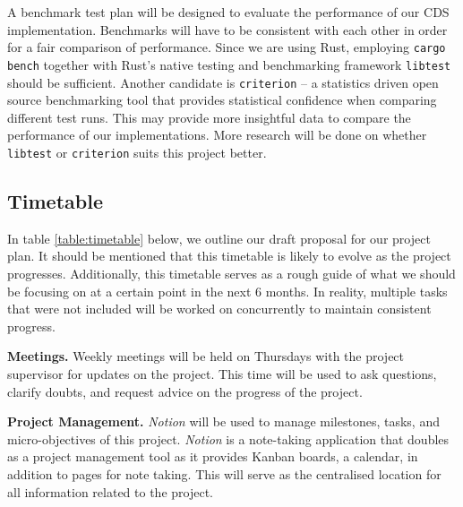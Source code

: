 A benchmark test plan will be designed to evaluate the performance of our CDS implementation. Benchmarks will have to be consistent with each other in order for a fair comparison of performance. Since we are using Rust, employing \texttt{cargo bench} together with Rust's native testing and benchmarking framework \texttt{libtest} should be sufficient. Another candidate is \texttt{criterion} -- a statistics driven open source benchmarking tool that provides statistical confidence when comparing different test runs. This may provide more insightful data to compare the performance of our implementations. More research will be done on whether \texttt{libtest} or \texttt{criterion} suits this project better.

\subsection{Timetable}
\label{sec:timetable}

In table \ref{table:timetable} below, we outline our draft proposal for our project plan. It should be mentioned that this timetable is likely to evolve as the project progresses. Additionally, this timetable serves as a rough guide of what we should be focusing on at a certain point in the next 6 months. In reality, multiple tasks that were not included will be worked on concurrently to maintain consistent progress. 

\textbf{Meetings.} Weekly meetings will be held on Thursdays with the project supervisor for updates on the project. This time will be used to ask questions, clarify doubts, and request advice on the progress of the project. 

\textbf{Project Management.} \textit{Notion} will be used to manage milestones, tasks, and micro-objectives of this project. \textit{Notion} is a note-taking application that doubles as a project management tool as it provides Kanban boards, a calendar, in addition to pages for note taking. This will serve as the centralised location for all information related to the project. 

